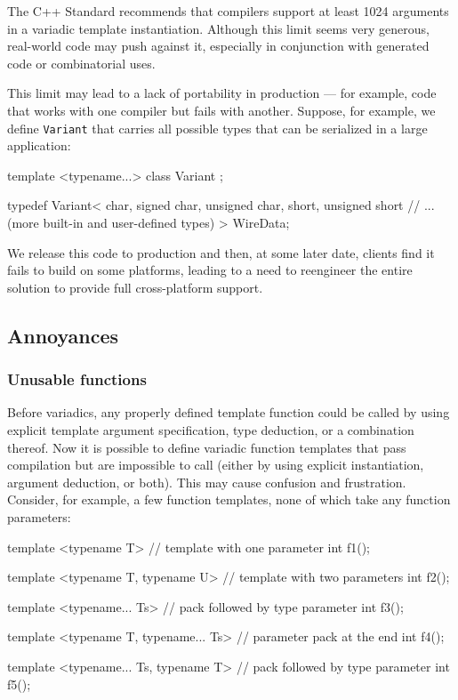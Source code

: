 The C++ Standard recommends that compilers support at least 1024
arguments in a variadic template instantiation. Although this limit
seems very generous, real-world code may push against it, especially in
conjunction with generated code or combinatorial uses.

This limit may lead to a lack of portability in production --- for
example, code that works with one compiler but fails with another.
Suppose, for example, we define \lstinline!Variant! that carries all
possible types that can be serialized in a large application:


\begin{emcppshiddenlisting}[emcppsbatch=e41]
template <typename...>
class Variant { };
\end{emcppshiddenlisting}
\begin{emcppslisting}[emcppsbatch=e41]
typedef Variant<
    char,
    signed char,
    unsigned char,
    short,
    unsigned short
    // ... (more built-in and user-defined types)
>
WireData;
\end{emcppslisting}
    

\noindent We release this code to production and then, at some later date, clients
find it fails to build on some platforms, leading to a need to
reengineer the entire solution to provide full cross-platform support.

\subsection[Annoyances]{Annoyances}\label{annoyances-variadic}

\subsubsection[Unusable functions]{Unusable functions}\label{unusable-functions}

Before variadics, any properly defined template function could be called
by using explicit template argument specification, type deduction, or a
combination thereof. Now it is possible to define variadic function
templates that pass compilation but are impossible to call (either by
using explicit instantiation, argument deduction, or both). This may
cause confusion and frustration. Consider, for example, a few function
templates, none of which take any function parameters:

\begin{emcppslisting}[emcppsbatch=e42]
template <typename T>                  // template with one parameter
int f1();

template <typename T, typename U>      // template with two parameters
int f2();

template <typename... Ts>              // pack followed by type parameter
int f3();

template <typename T, typename... Ts>  // parameter pack at the end
int f4();

template <typename... Ts, typename T>  // pack followed by type parameter
int f5();
\end{emcppslisting}
    

